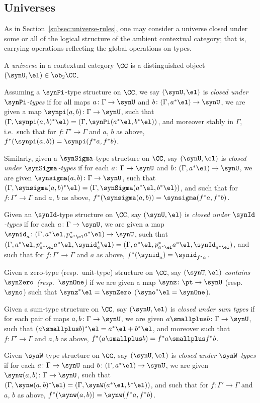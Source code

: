 \subsection{Universes}

As in Section~\ref{subsec:universe-rules}, one may consider a universe closed under some or all of the logical structure of the ambient contextual category; that is, carrying operations reflecting the global operations on types.

\begin{definition}
A \emph{universe} in a contextual category $\CC$ is a distinguished object $(\synU,\el) \in \ob_2 \CC$.

Assuming a $\synPi$-type structure on $\CC$, we say $(\synU,\el)$ is \emph{closed under $\synPi$-types} if for all maps $a \colon \Gamma \to \synU$ and $b \colon (\Gamma, a^*\el) \to \synU$, we are given a map $\synpi(a,b) \colon \Gamma \to \synU$, such that $(\Gamma,\synpi(a,b)^*\el) = (\Gamma,\synPi(a^*\el,b^*\el))$, and moreover stably in $\Gamma$, i.e.\ such that for $f \colon \Gamma' \to \Gamma$ and $a$, $b$ as above, $f^*(\synpi(a,b)) = \synpi(f^*a,f^*b)$.

Similarly, given a $\synSigma$-type structure on $\CC$, say $(\synU,\el)$ is \emph{closed under $\synSigma$-types} if for each $a \colon \Gamma \to \synU$ and $b \colon (\Gamma, a^*\el) \to \synU$, we are given $\synsigma(a,b) \colon \Gamma \to \synU$, such that $(\Gamma,\synsigma(a,b)^*\el) = (\Gamma,\synSigma(a^*\el,b^*\el))$, and such that for $f \colon \Gamma' \to \Gamma$ and $a$, $b$ as above, $f^*(\synsigma(a,b)) = \synsigma(f^*a,f^*b)$.

Given an $\synId$-type structure on $\CC$, say $(\synU,\el)$ is \emph{closed under $\synId$-types} if for each $a \colon \Gamma \to \synU$, we are given a map $\synid_a \colon (\Gamma,a^*\el,p_{a^*\el}^*a^*\el) \to \synU$, such that $(\Gamma,a^*\el,p_{a^*\el}^*a^*\el,\synid_a^*\el) = (\Gamma,a^*\el,p_{a^*\el}^*a^*\el,\synId_{a^*\el})$, and such that for $f \colon \Gamma' \to \Gamma$ and $a$ as above, $f^*(\synid_a) = \synid_{f^*a}$.

Given a zero-type (resp.\ unit-type) structure on $\CC$, say $(\synU,\el)$ \emph{contains $\synZero$ (resp.\ $\synOne$)} if we are given a map $\synz \colon \pt \to \synU$ (resp.\ $\syno$) such that $\synz^*\el = \synZero$ ($\syno^*\el = \synOne$).

Given a sum-type structure on $\CC$, say $(\synU,\el)$ is \emph{closed under sum types} if for each pair of maps $a,b \colon \Gamma \to \synU$, we are given $a \smallplus b \colon \Gamma \to \synU$, such that $(a \smallplus b)^*\el = a^*\el + b^*\el$, and moreover such that $f \colon \Gamma' \to \Gamma$ and $a,b$ as above, $f^*(a \smallplus b) = f^*a \smallplus f^*b$.

Given $\synW$-type structure on $\CC$, say $(\synU,\el)$ is \emph{closed under $\synW$-types} if for each $a \colon \Gamma \to \synU$ and $b \colon (\Gamma, a^*\el) \to \synU$, we are given $\synw(a,b) \colon \Gamma \to \synU$, such that $(\Gamma,\synw(a,b)^*\el) = (\Gamma,\synW(a^*\el,b^*\el))$, and such that for $f \colon \Gamma' \to \Gamma$ and $a$, $b$ as above, $f^*(\synw(a,b)) = \synw(f^*a,f^*b)$.
\end{definition}

